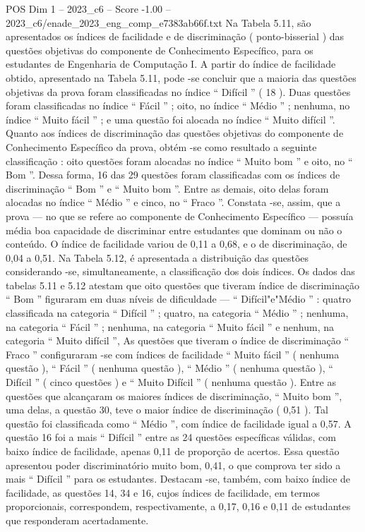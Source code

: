 \begin{textsample}{POS Dim 1 – 2023\_c6 – Score -1.00 – 2023\_c6/enade\_2023\_eng\_comp\_e7383ab66f.txt}
Na Tabela 5.11, são apresentados os índices de facilidade e de discriminação ( ponto-bisserial ) das questões objetivas do componente de Conhecimento Específico, para os estudantes de Engenharia de Computação I.
A partir do índice de facilidade obtido, apresentado na Tabela 5.11, pode -se concluir que a maioria das questões objetivas da prova foram classificadas no índice “ Difícil ” ( 18 ).
Duas questões foram classificadas no índice “ Fácil ” ; oito, no índice “ Médio ” ; nenhuma, no índice “ Muito fácil ” ; e uma questão foi alocada no índice “ Muito difícil ”.
Quanto aos índices de discriminação das questões objetivas do componente de Conhecimento Específico da prova, obtém -se como resultado a seguinte classificação : oito questões foram alocadas no índice “ Muito bom ” e oito, no “ Bom ”.
Dessa forma, 16 das 29 questões foram classificadas com os índices de discriminação “ Bom ” e “ Muito bom ”.
Entre as demais, oito delas foram alocadas no índice “ Médio ” e cinco, no “ Fraco ”.
Constata -se, assim, que a prova — no que se refere ao componente de Conhecimento Específico — possuía média boa capacidade de discriminar entre estudantes que dominam ou não o conteúdo.
O índice de facilidade variou de 0,11 a 0,68, e o de discriminação, de 0,04 a 0,51.
Na Tabela 5.12, é apresentada a distribuição das questões considerando -se, simultaneamente, a classificação dos dois índices.
Os dados das tabelas 5.11 e 5.12 atestam que oito questões que tiveram índice de discriminação “ Bom ” figuraram em duas níveis de dificuldade — “ Difícil"e"Médio ” : quatro classificada na categoria “ Difícil ” ; quatro, na categoria “ Médio ” ; nenhuma, na categoria “ Fácil ” ; nenhuma, na categoria “ Muito fácil ” e nenhum, na categoria “ Muito difícil ”, As questões que tiveram o índice de discriminação “ Fraco ” configuraram -se com índices de facilidade “ Muito fácil ” ( nenhuma questão ), “ Fácil ” ( nenhuma questão ), “ Médio ” ( nenhuma questão ), “ Difícil ” ( cinco questões ) e “ Muito Difícil ” ( nenhuma questão ).
Entre as questões que alcançaram os maiores índices de discriminação, “ Muito bom ”, uma delas, a questão 30, teve o maior índice de discriminação ( 0,51 ).
Tal questão foi classificada como “ Médio ”, com índice de facilidade igual a 0,57.
A questão 16 foi a mais “ Difícil ” entre as 24 questões específicas válidas, com baixo índice de facilidade, apenas 0,11 de proporção de acertos.
Essa questão apresentou poder discriminatório muito bom, 0,41, o que comprova ter sido a mais “ Difícil ” para os estudantes.
Destacam -se, também, com baixo índice de facilidade, as questões 14, 34 e 16, cujos índices de facilidade, em termos proporcionais, correspondem, respectivamente, a 0,17, 0,16 e 0,11 de estudantes que responderam acertadamente.

\end{textsample}
